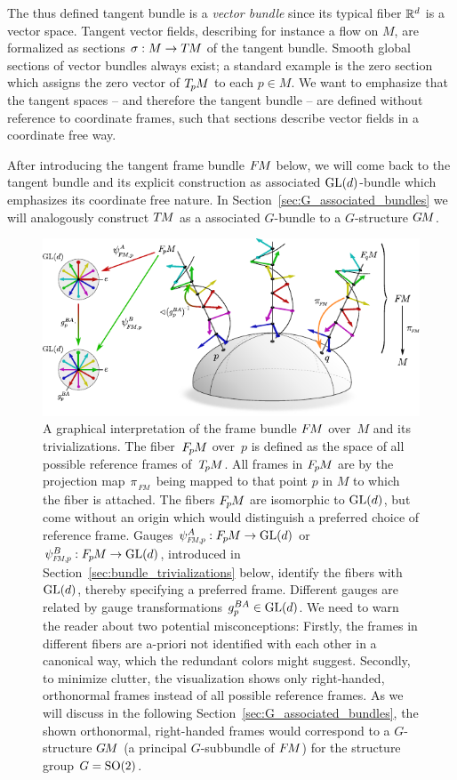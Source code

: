 The thus defined tangent bundle is a \emph{vector bundle} since its typical fiber $\mathbb{R}^d$ is a vector space.
Tangent vector fields, describing for instance a flow on $M$, are formalized as sections $\sigma: M\to T\mkern-1.5muM$ of the tangent bundle.
Smooth global sections of vector bundles always exist; a standard example is the zero section which assigns the zero vector of $T_{\mkern-1.5mu p}\mkern-.5muM$ to each $p\in M$.
We want to emphasize that the tangent spaces -- and therefore the tangent bundle -- are defined without reference to coordinate frames, such that sections describe vector fields in a coordinate free way.

After introducing the tangent frame bundle $F\mkern-1.5muM$ below, we will come back to the tangent bundle and its explicit construction as associated $\operatorname{GL}(d)$-bundle which emphasizes its coordinate free nature.
In Section~\ref{sec:G_associated_bundles} we will analogously construct $T\mkern-1.5muM$ as a associated $G$-bundle to a $G$-structure $G\mkern-1.4muM$.


\begin{figure}
    \centering
    \includegraphics[width=1.\columnwidth]{figures/frame_bundle.pdf}
    \vspace*{-1ex}
    \caption{\small
        A graphical interpretation of the frame bundle $F\mkern-1.5muM$ over~$M$ and its trivializations.
        The fiber~$F_{\mkern-1.5mu p}\mkern-1.0muM$ over~$p$ is defined as the space of all possible reference frames of~$T_{\mkern-1.5mu p}\mkern-.5muM$.
        All frames in $F_{\mkern-1.5mu p}\mkern-1.0muM$ are by the projection map $\piFM$ being mapped to that point $p$ in $M$ to which the fiber is attached.
        The fibers $F_{\mkern-1.5mu p}\mkern-1.0muM$ are isomorphic to $\operatorname{GL}(d)$, but come without an origin which would distinguish a preferred choice of reference frame.
        Gauges $\psiFMp^A: \FpM \to \GL{d}$ or $\psiFMp^B: \FpM \to \GL{d}$, introduced in Section~\ref{sec:bundle_trivializations} below, identify the fibers with $\operatorname{GL}(d)$, thereby specifying a preferred frame.
        Different gauges are related by gauge transformations $g_p^{BA} \in \operatorname{GL}(d)$.
        We need to warn the reader about two potential misconceptions:
        Firstly, the frames in different fibers are a-priori not identified with each other in a canonical way, which the redundant colors might suggest.
        Secondly, to minimize clutter, the visualization shows only right-handed, orthonormal frames instead of all possible reference frames.
        As we will discuss in the following Section~\ref{sec:G_associated_bundles}, the shown orthonormal, right-handed frames would correspond to a $G$-structure $G\mkern-1.4muM$ (a principal $G$-subbundle of $F\mkern-1.5muM$) for the structure group $G=\operatorname{SO}(2)$.
        }
    \label{fig:frame_bundle}
\end{figure}


